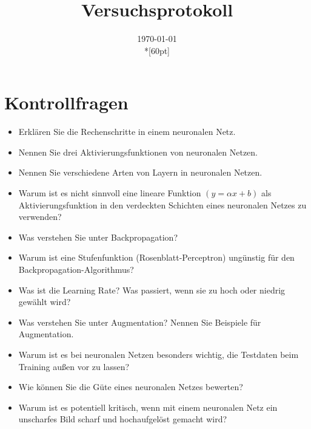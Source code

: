 \documentclass[a4paper,12pt,titlepage]{scrartcl}
\begin{document}
\titlehead
{
    \small
    {
        Technische Universität Ilmenau\\
        Fakulät IA\\
        Institut für Biomedizinische Technik und Informatik\\

        Praktikum Deep Learning in der Biomedizintechnik\\
        WS 2021/22}
}

\title {Versuchsprotokoll}
\author{}
\date{\today\\*[60pt]}
\maketitle  %

\pagestyle{fancy}
\newpage

\section{Kontrollfragen}
\begin{itemize}
    \item Erklären Sie die Rechenschritte in einem neuronalen Netz.
    \item Nennen Sie drei Aktivierungsfunktionen von neuronalen Netzen.
    \item Nennen Sie verschiedene Arten von Layern in neuronalen Netzen.
    \item Warum ist es nicht sinnvoll eine lineare Funktion $(y=\alpha x+b)$ als Aktivierungsfunktion in den verdeckten Schichten eines neuronalen Netzes zu verwenden?
    \item Was verstehen Sie unter Backpropagation?
    \item Warum ist eine Stufenfunktion (Rosenblatt-Perceptron) ungünstig für den Backpropagation-Algorithmus?
    \item Was ist die Learning Rate? Was passiert, wenn sie zu hoch oder niedrig gewählt wird?
    \item Was verstehen Sie unter Augmentation? Nennen Sie Beispiele für Augmentation.
    \item Warum ist es bei neuronalen Netzen besonders wichtig, die Testdaten beim Training außen vor zu lassen?
    \item Wie können Sie die Güte eines neuronalen Netzes bewerten?
    \item Warum ist es potentiell kritisch, wenn mit einem neuronalen Netz ein unscharfes Bild scharf und hochaufgelöst gemacht wird?
\end{itemize}
\end{document}
